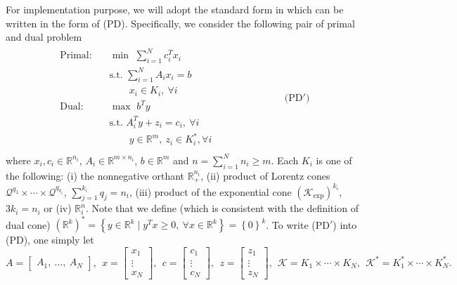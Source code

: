 \documentclass[11pt]{article}
\theoremstyle{definition}
\theoremstyle{plain}
\begin{document}
For implementation purpose, we will adopt the standard form in \cite{SDPT3_2010} which can be written in the form of (PD). Specifically, we consider the following pair of primal and dual problem
\begin{align*}
\begin{split}
\text{Primal:}\quad &\min\,\, \sum_{i=1}^N c_i^Tx_i\\
& \text{s.t.}\,\, \sum_{i=1}^N A_i x_i = b \\
&\quad\quad x_i \in K_i,\ \forall i \\[1ex] 
\text{Dual:} \quad &\max\,\, b^T y\\
& \text{s.t.}\,\, A_i^T y + z_i = c_i, \ \forall i \\
&\quad\quad y \in \mathbb{R}^m,\ z_i \in K_i^*, \forall i \\[1ex]
\end{split} \quad\quad\quad\quad\quad\quad\quad \text{(PD$'$)}
\end{align*}
where $x_i, c_i \in \mathbb{R}^{n_i}$, $A_i \in \mathbb{R}^{m\times n_i}$, $b \in \mathbb{R}^m$ and $n = \sum_{i=1}^N n_i \geq m$. Each $K_i$ is one of the following: (i) the nonnegative orthant $\mathbb{R}_+^{n_i}$, (ii) product of Lorentz cones $\mathcal{Q}^{q_1}\times \cdots \times \mathcal{Q}^{q_{k_i}}$, $\sum_{j=1}^{k_i} q_j = n_i$, (iii) product of the exponential cone  $\left(\mathcal{K}_{\exp}\right)^{k_i}$, $3k_i = n_i$ or (iv) $\mathbb{R}^n_i$. Note that we define (which is consistent with the definition of dual cone) $\left(\mathbb{R}^k\right)^* = \left\{ y \in \mathbb{R}^k \mid y^T x \geq 0,\ \forall x \in \mathbb{R}^k  \right\} = \left\{0\right\}^k$. To write (PD$'$) into (PD), one simply let
\[  A = \begin{bmatrix} A_1,\ \hdots,\  A_N \end{bmatrix},\ \
x = \begin{bmatrix} x_1 \\ \vdots\\ x_N \end{bmatrix},\ \ 
c = \begin{bmatrix} c_1 \\ \vdots \\c_N \end{bmatrix},\ \
z = \begin{bmatrix} z_1 \\ \vdots \\ z_N \end{bmatrix},\ \ \mathcal{K} = K_1 \times \cdots \times K_N,\ \ \mathcal{K}^* = K_1^* \times \cdots \times K_N^*.\]
\end{document}
